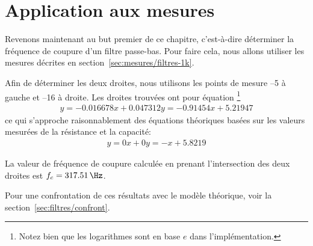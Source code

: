 \section{Application aux mesures}

Revenons maintenant au but premier de ce chapitre,
c'est-à-dire déterminer la fréquence de coupure d'un filtre passe-bas.
Pour faire cela, nous allons utiliser les mesures décrites en
section~\ref{sec:mesures/filtres-1k}.

Afin de déterminer les deux droites, nous utilisons les points de mesure
--5 à gauche et --16 à droite.
Les droites trouvées ont pour équation%
\footnote{
    Notez bien que les logarithmes sont en base $e$ dans l'implémentation.
}
\begin{equation}
    \begin{array}{rcl}
        y = -0.016678x+0.047312
        y = -0.91454x+5.21947
    \end{array}
\end{equation}
ce qui s'approche raisonnablement des équations théoriques basées sur 
les valeurs mesurées de la résistance et la capacité:
\begin{equation}
    \begin{array}{rcl}
        y = 0x+0
        y = -x+5.8219
    \end{array}
\end{equation}

La valeur de fréquence de coupure calculée
en prenant l'intersection des deux droites est $f_c=317.51\,\Hz$.

Pour une confrontation de ces résultats avec le modèle théorique,
voir la section~\ref{sec:filtres/confront}.
